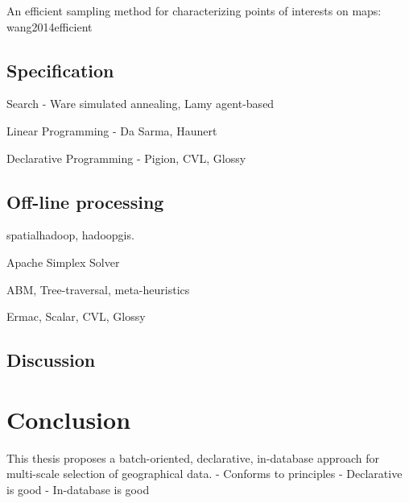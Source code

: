 \documentclass[11pt, oneside]{report}
\begin{document}
{%
An efficient sampling method for characterizing points of interests on maps: wang2014efficient

\subsection{Specification}

Search
- Ware simulated annealing, Lamy agent-based

Linear Programming
- Da Sarma, Haunert

Declarative Programming
- Pigion, CVL, Glossy

\subsection{Off-line processing}

spatialhadoop, hadoopgis.

Apache Simplex Solver

ABM, Tree-traversal, meta-heuristics

Ermac, Scalar, CVL, Glossy

\subsection{Discussion}


\section{Conclusion}

This thesis proposes a batch-oriented, declarative, in-database approach for multi-scale selection of geographical data.
- Conforms to principles
- Declarative is good
- In-database is good


}
\end{document}
